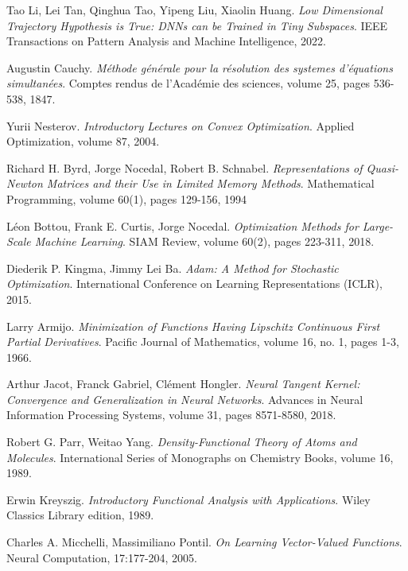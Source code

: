 \documentclass[11pt, a4paper]{article}
\begin{document}
\pagebreak
\begin{thebibliography}{999}

 Tao Li, Lei Tan, Qinghua Tao, Yipeng Liu, Xiaolin Huang. \textit{Low Dimensional Trajectory Hypothesis is True: DNNs can be Trained in Tiny Subspaces}. IEEE Transactions on Pattern Analysis and Machine Intelligence, 2022.

 Augustin Cauchy. \textit{M\'{e}thode g\'{e}n\'{e}rale pour la r\'{e}solution des systemes d'\'{e}quations simultan\'{e}es}. Comptes rendus de l'Acad\'{e}mie des sciences, volume 25, pages 536-538, 1847.

 Yurii Nesterov. \textit{Introductory Lectures on Convex Optimization}. Applied Optimization, volume 87, 2004.

 Richard H. Byrd, Jorge Nocedal, Robert B. Schnabel. \textit{Representations of Quasi-Newton Matrices and their Use in Limited Memory Methods}. Mathematical Programming, volume 60(1), pages 129-156, 1994 

 L\'{e}on Bottou, Frank E. Curtis, Jorge Nocedal. \textit{Optimization Methods for Large-Scale Machine Learning}. SIAM Review, volume 60(2), pages 223-311, 2018.

 Diederik P. Kingma, Jimmy Lei Ba. \textit{Adam: A Method for Stochastic Optimization}. International Conference on Learning Representations (ICLR), 2015.

 Larry Armijo. \textit{Minimization of Functions Having Lipschitz Continuous First Partial Derivatives}. Pacific Journal of Mathematics, volume 16, no. 1, pages 1-3, 1966.

 Arthur Jacot, Franck Gabriel, Cl\'{e}ment Hongler. \textit{Neural Tangent Kernel: Convergence and Generalization in Neural Networks}. Advances in Neural Information Processing Systems, volume 31, pages 8571-8580, 2018.

 Robert G. Parr, Weitao Yang. \textit{Density-Functional Theory of Atoms and Molecules}. International Series of Monographs on Chemistry Books, volume 16, 1989.

 Erwin Kreyszig. \textit{Introductory Functional Analysis with Applications}. Wiley Classics Library edition, 1989.

 Charles A. Micchelli, Massimiliano Pontil. \textit{On Learning Vector-Valued Functions}. Neural Computation, 17:177-204, 2005.


\end{thebibliography}
\end{document}

